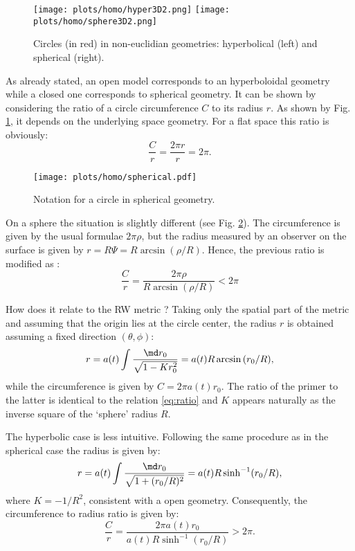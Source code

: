 \begin{figure}[htbp]
	\centering
		\texttt{[image: plots/homo/hyper3D2.png]}
		\texttt{[image: plots/homo/sphere3D2.png]}
	\caption{Circles (in red) in non-euclidian geometries: hyperbolical (left) and spherical (right).}
	\label{fig:plots_homo_hyper3D2}
\end{figure}
As already stated, an open model corresponds to an hyperboloidal geometry while a closed one corresponds to spherical geometry. It can be shown by considering the ratio of a circle circumference $C$ to its radius $r$. As shown by Fig. \ref{fig:plots_homo_hyper3D2}, it depends on the underlying space geometry. For a flat space this ratio is obviously:
\begin{equation}
	\frac{C}{r}=\frac{2\pi r}{r}=2\pi.
\end{equation}
\begin{figure}[htbp]
	\centering
		\texttt{[image: plots/homo/spherical.pdf]}
	\caption{Notation for a circle in spherical geometry.}
	\label{fig:plots_homo_spherical}
\end{figure}
On a sphere the situation is slightly different (see Fig. \ref{fig:plots_homo_spherical}). The circumference is given by the usual formulae $2\pi\rho$, but the radius measured by an observer on the surface is given by $r=R\Psi=R\arcsin(\rho/R)$. Hence, the previous ratio is modified as :
\begin{equation}
	\frac{C}{r}=\frac{2\pi \rho}{R\arcsin(\rho/R)}<2\pi
	\label{eq:ratio}
\end{equation}

How does it relate to the RW metric ? Taking only the spatial part of the metric and assuming that the origin lies at the circle center, the radius $r$ is obtained assuming a fixed direction $(\theta,\phi)$:
\begin{equation}
	r=a(t)\int\frac{\md r_0}{\sqrt{1-Kr_0^2}}=a(t)R\arcsin{(r_0/R)},
\end{equation}
while the circumference is given by $C=2\pi a(t)r_0$. The ratio of the primer to the latter is identical to the relation \ref{eq:ratio} and $K$ appears naturally as the inverse square of the `sphere' radius $R$.

The hyperbolic case is less intuitive. Following the same procedure as in the spherical case the radius is given by:
\begin{equation}
		r=a(t)\int\frac{\md r_0}{\sqrt{1+(r_0/R)^2}}=a(t)R\sinh^{-1}(r_0/R),
\end{equation}
where $K=-1/R^2$, consistent with a open geometry. Consequently, the circumference to radius ratio is given by:
\begin{equation}
	\frac{C}{r}=\frac{2\pi a(t) r_0}{a(t)R\sinh^{-1}(r_0/R)}>2\pi.
\end{equation}

